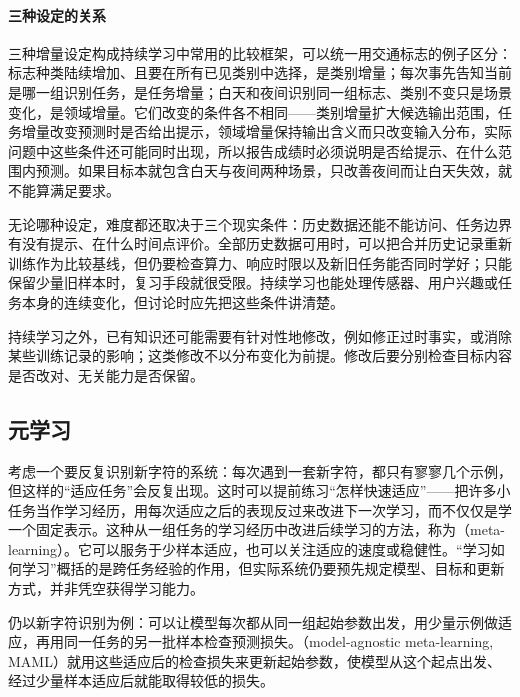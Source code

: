 \paragraph{三种设定的关系}

三种增量设定构成持续学习中常用的比较框架，可以统一用交通标志的例子区分：标志种类陆续增加、且要在所有已见类别中选择，是类别增量；每次事先告知当前是哪一组识别任务，是任务增量；白天和夜间识别同一组标志、类别不变只是场景变化，是领域增量。它们改变的条件各不相同——类别增量扩大候选输出范围，任务增量改变预测时是否给出提示，领域增量保持输出含义而只改变输入分布，实际问题中这些条件还可能同时出现，所以报告成绩时必须说明是否给提示、在什么范围内预测。如果目标本就包含白天与夜间两种场景，只改善夜间而让白天失效，就不能算满足要求。

无论哪种设定，难度都还取决于三个现实条件：历史数据还能不能访问、任务边界有没有提示、在什么时间点评价。全部历史数据可用时，可以把合并历史记录重新训练作为比较基线，但仍要检查算力、响应时限以及新旧任务能否同时学好；只能保留少量旧样本时，复习手段就很受限。持续学习也能处理传感器、用户兴趣或任务本身的连续变化，但讨论时应先把这些条件讲清楚。

持续学习之外，已有知识还可能需要有针对性地修改，例如修正过时事实，或消除某些训练记录的影响；这类修改不以分布变化为前提。修改后要分别检查目标内容是否改对、无关能力是否保留。

\subsection{元学习}
\label{sec:meta-learning}

考虑一个要反复识别新字符的系统：每次遇到一套新字符，都只有寥寥几个示例，但这样的“适应任务”会反复出现。这时可以提前练习“怎样快速适应”——把许多小任务当作学习经历，用每次适应之后的表现反过来改进下一次学习，而不仅仅是学一个固定表示。这种从一组任务的学习经历中改进后续学习的方法，称为（meta-learning）。它可以服务于少样本适应，也可以关注适应的速度或稳健性。“学习如何学习”概括的是跨任务经验的作用，但实际系统仍要预先规定模型、目标和更新方式，并非凭空获得学习能力。

仍以新字符识别为例：可以让模型每次都从同一组起始参数出发，用少量示例做适应，再用同一任务的另一批样本检查预测损失。（model-agnostic meta-learning, MAML）就用这些适应后的检查损失来更新起始参数，使模型从这个起点出发、经过少量样本适应后就能取得较低的损失。


